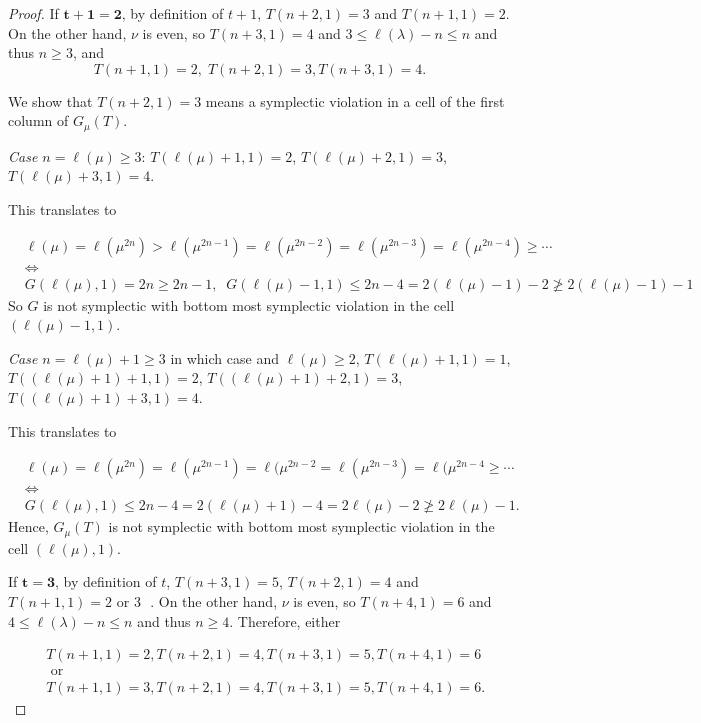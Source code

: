 \documentclass[reqno]{amsart}
\theoremstyle{tplain}
\begin{document}
{\begin{proof}
If $\mathbf{t+1=2}$,  by definition of $t+1$, $T(n+2,1)=3$ and $T(n+1,1)=2$. On the other hand, $\nu$ is even,  so $T(n+3,1)=4$ and $3\le \ell(\lambda)-n\le n$ and thus $n\ge 3$, and
$$T(n+1,1)=2, \;T(n+2,1)=3, T(n+3,1)=4.$$

We show that $T(n+2,1)=3$ means a symplectic violation in a cell of the first column of $G_\mu(T)$.

\medskip
\emph{Case $n=\ell(\mu)\ge 3$}:   $T(\ell(\mu)+1,1)=2$, $T(\ell(\mu)+2,1)=3$,
$T(\ell(\mu)+3,1)=4$.

This translates to

\begin{align*}&\ell(\mu)=\ell(\mu^{2n})>\ell(\mu^{2n-1})=\ell(\mu^{2n-2})=\ell(\mu^{2n-3})=\ell(\mu^{2n-4})\ge\cdots \\
&\Leftrightarrow \\
&G(\ell(\mu),1)=2n\ge 2n-1,\;\;
G(\ell(\mu)-1,1)\le 2n-4=2(\ell(\mu)-1)-2 \ngeq 2(\ell(\mu)-1)-1
\end{align*}
So
$G$ is not symplectic with bottom most symplectic violation in the cell $(\ell(\mu)-1,1)$.

\medskip

\emph{Case  $n=\ell(\mu)+1\ge 3$} in which case and $\ell(\mu)\ge 2$, $T(\ell(\mu)+1,1)=1$, $T((\ell(\mu)+1)+1,1)=2$,
$T((\ell(\mu)+1)+2,1)=3$, $T((\ell(\mu)+1)+3,1)=4$.

This translates to

\begin{align*}&\ell(\mu)=\ell(\mu^{2n})=\ell(\mu^{2n-1})=\ell(\mu^{2n-2}=\ell(\mu^{2n-3})=\ell(\mu^{2n-4}\ge\cdots\nonumber \\
&\Leftrightarrow\\
 &G(\ell(\mu),1)\le 2n-4=2(\ell(\mu)+1)-4=2\ell(\mu)-2\ngeq 2\ell(\mu)-1.
\end{align*}
Hence,  $G_\mu(T)$ is not symplectic with bottom most symplectic violation in the cell $(\ell(\mu),1)$.
\medskip

\iffalse
If $\mathbf{t=3}$, by definition of $t$, $T(n+3,1)=5$, $T(n+2,1)=4$ and $T(n+1,1)=2 \mbox{ or $3$ }$. On the other hand, $\nu$ is even,  so $T(n+4,1)=6$ and $4\le \ell(\lambda)-n\le n$ and thus $n\ge 4$. Therefore, either

\begin{align}&T(n+1,1)=2, T(n+2,1)=4, T(n+3,1)=5, T(n+4,1)=6  \label{one}\\
&\mbox{ or}\nonumber\\
&T(n+1,1)=3, T(n+2,1)=4, T(n+3,1)=5, T(n+4,1)=6.\label{two}
\end{align}


\end{proof}}
\end{document}
